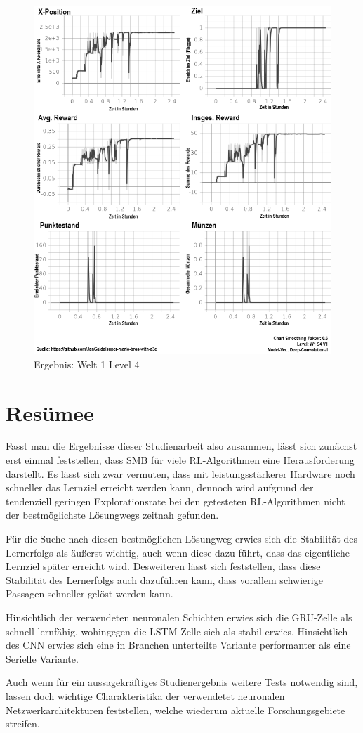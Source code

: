 \documentclass[sigconf,nonacm]{acmart}
\begin{document}
\begin{figure}[hbt!]
\includegraphics[width=\columnwidth]{images/stats_w1s4v0_dcn.png}
\caption{Ergebnis: Welt 1 Level 4}
\label{fig:w1s4}
\end{figure}

\section{Resümee}
Fasst man die Ergebnisse dieser Studienarbeit also zusammen, lässt sich zunächst erst einmal feststellen, dass SMB für viele RL-Algorithmen eine Herausforderung darstellt. Es lässt sich zwar vermuten, dass mit leistungsstärkerer Hardware noch schneller das Lernziel erreicht werden kann, dennoch wird aufgrund der tendenziell geringen Explorationsrate bei den getesteten RL-Algorithmen nicht der bestmöglichste Lösungwegs zeitnah gefunden.

Für die Suche nach diesen bestmöglichen Lösungweg erwies sich die Stabilität des Lernerfolgs als äußerst wichtig, auch wenn diese dazu führt, dass das eigentliche Lernziel später erreicht wird. Desweiteren lässt sich feststellen, dass diese Stabilität des Lernerfolgs auch dazuführen kann, dass vorallem schwierige Passagen schneller gelöst werden kann.

Hinsichtlich der verwendeten neuronalen Schichten erwies sich die GRU-Zelle als schnell lernfähig, wohingegen die LSTM-Zelle sich als stabil erwies. Hinsichtlich des CNN erwies sich eine in Branchen unterteilte Variante performanter als eine Serielle Variante.

Auch wenn für ein aussagekräftiges Studienergebnis weitere Tests notwendig sind, lassen doch wichtige Charakteristika der verwendetet neuronalen Netzwerkarchitekturen feststellen, welche wiederum aktuelle Forschungsgebiete streifen.



\listoffigures
\end{document}
